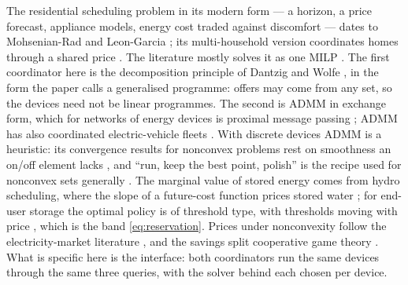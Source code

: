 \documentclass[11pt,a4paper]{article}
\begin{document}
The residential scheduling problem in its modern form --- a horizon, a price
forecast, appliance models, energy cost traded against discomfort --- dates to
Mohsenian-Rad and Leon-Garcia \cite{mohsenianrad2010}; its multi-household version
coordinates homes through a shared price \cite{mohsenianrad2010dsm}. The
literature mostly solves it as one MILP \cite{hemsreview2022}. The first
coordinator here is the decomposition principle of Dantzig and Wolfe
\cite{dantzigwolfe1960}, in the form the paper calls a generalised programme:
offers may come from any set, so the devices need not be linear programmes. The
second is ADMM \cite{boyd2011} in exchange form, which for networks of energy
devices is proximal message passing \cite{kraning2014}; ADMM has also coordinated
electric-vehicle fleets \cite{rivera2013}. With discrete devices ADMM is a
heuristic: its convergence results for nonconvex problems rest on smoothness an
on/off element lacks \cite{wang2019}, and ``run, keep the best point, polish'' is
the recipe used for nonconvex sets generally \cite{diamond2018}. The marginal
value of stored energy comes from hydro scheduling, where the slope of a
future-cost function prices stored water \cite{pereira1991,philpott2017}; for
end-user storage the optimal policy is of threshold type, with thresholds moving
with price \cite{vandeven2012}, which is the band \eqref{eq:reservation}. Prices
under nonconvexity follow the electricity-market literature
\cite{oneill2005,gribik2007}, and the savings split cooperative game theory
\cite{shapley1953,aumannshapley1974,owen1977}. What is specific here is the
interface: both coordinators run the same devices through the same three
queries, with the solver behind each chosen per device.
\end{document}
